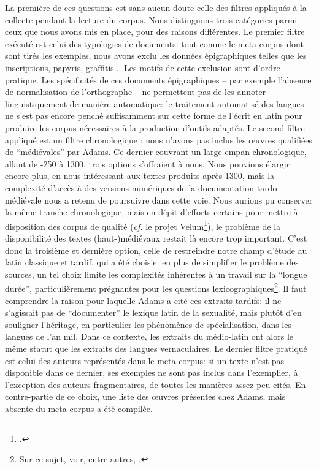 La première de ces questions est sans aucun doute celle des filtres appliqués à la collecte pendant la lecture du corpus. Nous distinguons trois catégories parmi ceux que nous avons mis en place, pour des raisons différentes. Le premier filtre exécuté est celui des typologies de documents: tout comme le meta-corpus dont sont tirés les exemples, nous avons exclu les données épigraphiques telles que les inscriptions, papyris, graffitis... Les motifs de cette exclusion sont d'ordre pratique. Les spécificités de ces documents épigraphiques -- par exemple l'absence de normalisation de l'orthographe -- ne permettent pas de les annoter linguistiquement de manière automatique: le traitement automatisé des langues ne s'est pas encore penché suffisamment sur cette forme de l'écrit en latin pour produire les corpus nécessaires à la production d'outils adaptés. Le second filtre appliqué est un filtre chronologique : nous n’avons pas inclus les œuvres qualifiées de \enquote{médiévales} par Adams. Ce dernier couvrant un large empan chronologique, allant de -250 à 1300, trois options s'offraient à nous. Nous pouvions élargir encore plus, en nous intéressant aux textes produits après 1300, mais la complexité d'accès à des versions numériques de la documentation tardo-médiévale nous a retenu de poursuivre dans cette voie. Nous aurions pu conserver la même tranche chronologique, mais en dépit d'efforts certains pour mettre à disposition des corpus de qualité (\textit{cf.} le projet Velum\footcite{bon2019challenges}), le problème de la disponibilité des textes (haut-)médiévaux restait là encore trop important. C'est donc la troisième et dernière option, celle de restreindre notre champ d'étude au latin classique et tardif, qui a été choisie: en plus de simplifier le problème des sources, un tel choix limite les complexités inhérentes à un travail sur la \enquote{longue durée}, particulièrement prégnantes pour les questions lexicographiques\footnote{Sur ce sujet, voir, entre autres, \textcite{gabay_lacteur_2015}.}. Il faut comprendre la raison pour laquelle Adams a cité ces extraits tardifs: il ne s'agissait pas de \enquote{documenter} le lexique latin de la sexualité, mais plutôt d'en souligner l'héritage, en particulier les phénomènes de spécialisation, dans les langues de l'an mil. Dans ce contexte, les extraits du médio-latin ont alors le même statut que les extraits des langues vernaculaires. Le dernier filtre pratiqué est celui des auteurs représentés dans le meta-corpus: si un texte n'est pas disponible dans ce dernier, ses exemples ne sont pas inclus dans l'exemplier, à l'exception des auteurs fragmentaires,  de toutes les manières assez peu cités. En contre-partie de ce choix, une liste des œuvres présentes chez Adams, mais absente du meta-corpus a été compilée.

